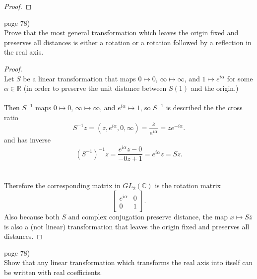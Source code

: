 \documentclass{article}
\newenvironment{problem}[2][Problem]{\begin{trivlist}
\item[\hskip \labelsep {\bfseries #1}\hskip \labelsep {\bfseries #2.}]}{\end{trivlist}}
\begin{document}
\begin{proof}
\end{proof}

\pagebreak

\begin{problem}{3} (page 78) \\
  Prove that the most general transformation which leaves the origin fixed and
  preserves all distances is either a rotation or a rotation followed by a
  reflection in the real axis.
\end{problem}

\begin{proof} \text{}\\
  Let $S$ be a linear transformation that maps $0 \mapsto 0$,
  $\infty \mapsto \infty$, and $1 \mapsto e^{i\alpha}$
  for some $\alpha \in \mathbb{R}$ (in order to preserve the unit distance
  between $S(1)$ and the origin.)\\
  \\
  Then $S^{-1}$ maps $0 \mapsto 0$, $\infty \mapsto \infty$, and
  $e^{i\alpha} \mapsto 1$, so $S^{-1}$ is described the the cross ratio \[
    S^{-1}z = (z, e^{i\alpha}, 0, \infty) =
    \frac{z}{e^{i\alpha}} = ze^{-i\alpha}.
  \] and has inverse \[
    (S^{-1})^{-1}z = \frac{e^{i\alpha}z - 0}{-0z + 1} = e^{i\alpha}z = Sz.
  \]\\
  \\
  Therefore the corresponding matrix in $GL_2(\mathbb{C})$ is the rotation matrix
  \[
     \begin{bmatrix}
       e^{i\alpha} & 0 \\
       0 & 1
     \end{bmatrix}.
  \]
  Also because both $S$ and complex conjugation preserve distance, the map
  $x \mapsto S\bar{z}$ is also a (not linear) transformation that leaves the
  origin fixed and preserves all distances.
\end{proof}
\pagebreak

\begin{problem}{4} (page 78) \\
  Show that any linear transformation which transforms the real axis into itself
  can be written with real coefficients.
\end{problem}
\end{document}
